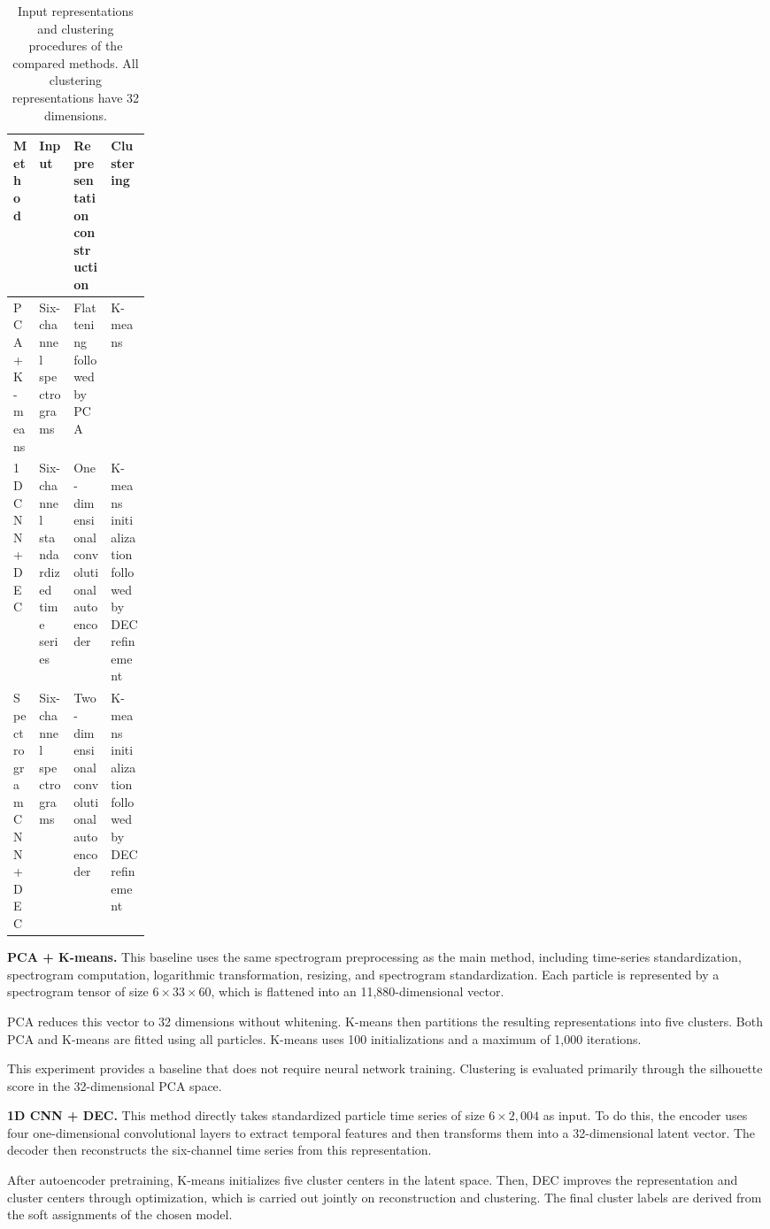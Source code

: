 \begin{table}[htbp]
\centering\small
\caption{Input representations and clustering procedures of the compared methods. All clustering representations have 32 dimensions.}\label{tab:methods}
\begin{tabularx}{\linewidth}{@{}p{0.18\linewidth}Y Y Y@{}}
\toprule
\textbf{Method} & \textbf{Input} & \textbf{Representation construction} & \textbf{Clustering} \\
\midrule
PCA + K-means & Six-channel spectrograms & Flattening followed by PCA & K-means \\
1D CNN + DEC & Six-channel standardized time series & One-dimensional convolutional autoencoder & K-means initialization followed by DEC refinement \\
Spectrogram CNN + DEC & Six-channel spectrograms & Two-dimensional convolutional autoencoder & K-means initialization followed by DEC refinement \\
\bottomrule
\end{tabularx}
\end{table}

\noindent\textbf{PCA + K-means.} This baseline uses the same spectrogram preprocessing as the main method, including time-series standardization, spectrogram computation, logarithmic transformation, resizing, and spectrogram standardization. Each particle is represented by a spectrogram tensor of size \(6\times33\times60\), which is flattened into an 11,880-dimensional vector.

PCA reduces this vector to 32 dimensions without whitening. K-means then partitions the resulting representations into five clusters. Both PCA and K-means are fitted using all particles. K-means uses 100 initializations and a maximum of 1,000 iterations.

This experiment provides a baseline that does not require neural network training. Clustering is evaluated primarily through the silhouette score in the 32-dimensional PCA space.

\noindent\textbf{1D CNN + DEC.} This method directly takes standardized particle time series of size \(6\times2,004\) as input. To do this, the encoder uses four one-dimensional convolutional layers to extract temporal features and then transforms them into a 32-dimensional latent vector. The decoder then reconstructs the six-channel time series from this representation.

After autoencoder pretraining, K-means initializes five cluster centers in the latent space. Then, DEC improves the representation and cluster centers through optimization, which is carried out jointly on reconstruction and clustering. The final cluster labels are derived from the soft assignments of the chosen model.

